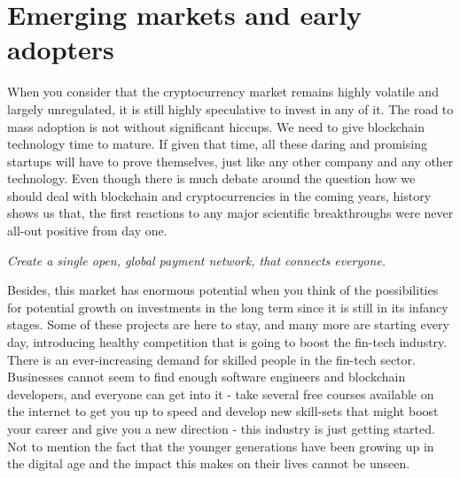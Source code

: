 \section{Emerging markets and early adopters}

When you consider that the cryptocurrency market remains highly volatile and largely unregulated, it is still highly speculative to invest in any of it. The road to mass adoption is not without significant hiccups. We need to give blockchain technology time to mature. If given that time, all these daring and promising startups will have to prove themselves, just like any other company and any other technology. Even though there is much debate around the question how we should deal with blockchain and cryptocurrencies in the coming years, history shows us that, the first reactions to any major scientific breakthroughs were never all-out positive from day one.\medskip

\medskip 
{}
    \begin{tcolorbox}
    [enhanced,
    title=The Internet of Value,
    frame style=
    {left color=orange!85!black,right color=yellow!95!black}]
        
           \textit{Create a single open, global payment network, that connects everyone.}
       
\end{tcolorbox}
\medskip

Besides, this market has enormous potential when you think of the possibilities for potential growth on investments in the long term since it is still in its infancy stages. Some of these projects are here to stay, and many more are starting every day, introducing healthy competition that is going to boost the fin-tech industry. There is an ever-increasing demand for skilled people in the fin-tech sector. Businesses cannot seem to find enough software engineers and blockchain developers, and everyone can get into it - take several free courses available on the internet to get you up to speed and develop new skill-sets that might boost your career and give you a new direction - this industry is just getting started. Not to mention the fact that the younger generations have been growing up in the digital age and the impact this makes on their lives cannot be unseen.\medskip




